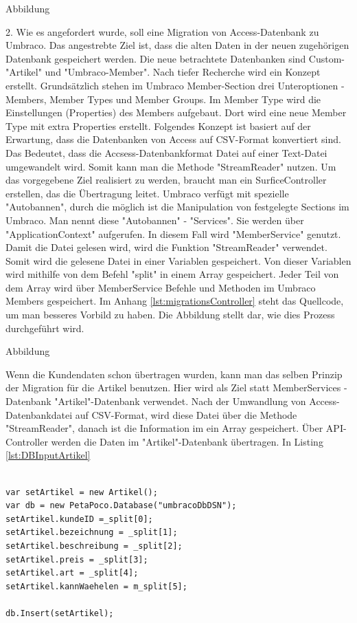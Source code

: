 Abbildung
 
2. Wie es angefordert wurde, soll eine Migration von Access-Datenbank zu Umbraco. Das angestrebte Ziel ist, dass die alten Daten in der neuen zugehörigen Datenbank gespeichert werden. Die neue betrachtete Datenbanken sind Custom-"Artikel" und "Umbraco-Member". 
Nach tiefer Recherche wird ein Konzept erstellt. 
Grundsätzlich stehen im Umbraco Member-Section \cite{OurUmbraco2018} drei Unteroptionen - Members, Member Types und Member Groups.
Im Member Type wird die Einstellungen (Properties) des Members aufgebaut. Dort wird eine neue Member Type mit extra Properties erstellt. 
Folgendes Konzept ist basiert auf der Erwartung, dass die Datenbanken von Access auf CSV-Format konvertiert sind. Das Bedeutet, dass die Accsess-Datenbankformat Datei auf einer Text-Datei umgewandelt wird. Somit kann man die Methode "StreamReader" nutzen.
Um das vorgegebene Ziel realisiert zu werden, braucht man ein SurficeController erstellen, das die Übertragung leitet. 
Umbraco verfügt mit spezielle "Autobannen", durch die möglich ist die Manipulation von festgelegte Sections im Umbraco. Man nennt diese "Autobannen" - "Services". Sie werden über "ApplicationContext" aufgerufen. In diesem Fall wird "MemberService" genutzt.
Damit die Datei gelesen wird, wird die Funktion "StreamReader" verwendet. Somit wird die gelesene Datei in einer Variablen gespeichert. Von dieser Variablen wird mithilfe von dem Befehl "split" in einem Array gespeichert. Jeder Teil von dem Array wird über MemberService Befehle und Methoden im Umbraco Members gespeichert. Im Anhang \ref{lst:migrationsController} steht das Quellcode, um man besseres Vorbild zu haben.
Die Abbildung stellt dar, wie dies Prozess durchgeführt wird.

Abbildung 

Wenn die Kundendaten schon übertragen wurden, kann man das selben Prinzip der Migration für die Artikel benutzen. Hier wird als Ziel statt MemberServices - Datenbank "Artikel"-Datenbank  verwendet. Nach der Umwandlung von Access-Datenbankdatei auf CSV-Format, wird diese Datei über die Methode "StreamReader", danach ist die Information im ein Array gespeichert. Über API-Controller werden die Daten im "Artikel"-Datenbank übertragen. In Listing \ref{lst:DBInputArtikel}

\begin{lstlisting}[caption={Datenbank "Artikel" - Transfer}, label=lst:DBInputArtikel]

var setArtikel = new Artikel();
var db = new PetaPoco.Database("umbracoDbDSN");
setArtikel.kundeID =_split[0];
setArtikel.bezeichnung = _split[1];
setArtikel.beschreibung = _split[2];
setArtikel.preis = _split[3];
setArtikel.art = _split[4];
setArtikel.kannWaehelen = m_split[5];

db.Insert(setArtikel);
\end{lstlisting}

